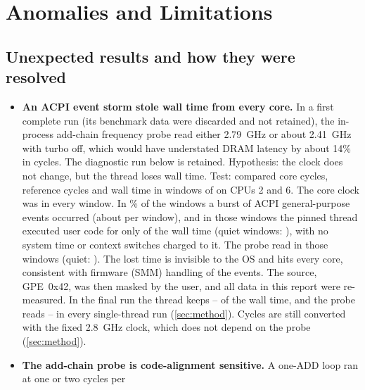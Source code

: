 \section{Anomalies and Limitations}\label{sec:anomalies}

\subsection{Unexpected results and how they were resolved}
\begin{itemize}
  \item \textbf{An ACPI event storm stole wall time from every core.} In a first complete run (its
        benchmark data were discarded and not retained), the
        in-process add-chain frequency probe read either \qty{2.79}{\giga\hertz} or about
        \qty{2.41}{\giga\hertz} with turbo off, which would have understated DRAM latency by about 14\% in
        cycles. The diagnostic  run below is retained. Hypothesis: the clock does not change, but the thread loses wall time. Test:
         compared core cycles, reference cycles and wall time in 
        windows of  on CPUs 2 and 6. The core clock was
         in every window. In \% of the windows a
        burst of ACPI general-purpose events occurred (about  per window), and in
        those windows the pinned thread executed user code for only  of the wall
        time (quiet windows: ), with no system time or context switches charged
        to it. The probe read  in those windows (quiet:
        ). The lost time is invisible to the OS and hits every core,
        consistent with firmware (SMM) handling of the events. The source, GPE~0x42, was then masked by the
        user, and all data in this report were re-measured. In the final  run the
        thread keeps -- of the wall time, and the probe reads
        -- in every single-thread run (\cref{sec:method}). Cycles are still converted with the fixed
        \qty{2.8}{\giga\hertz} clock, which does not depend on the probe (\cref{sec:method}).
  \item \textbf{The add-chain probe is code-alignment sensitive.} A one-ADD loop ran at one or two cycles per

\end{itemize}
